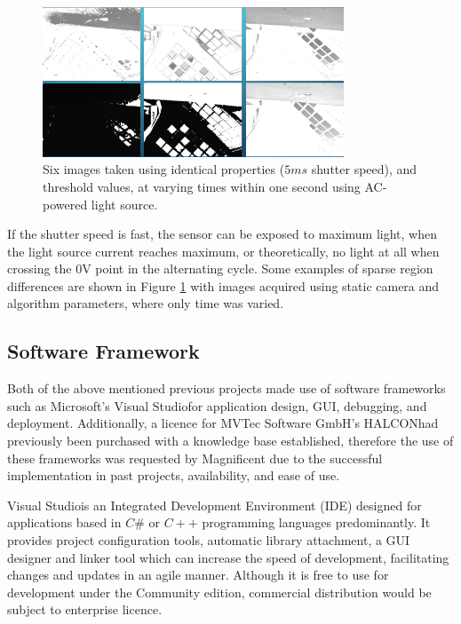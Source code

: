 \documentclass[fleqn,twoside,12pt]{report}
\begin{document}
\begin{figure}[h]
	\centering
	\includegraphics[width=0.8\textwidth]{flicker.png}
	\caption{Six images taken using identical properties ($5ms$ shutter speed), and threshold values, at varying times within one second using AC-powered light source.}
	\label{fig:flicker}
\end{figure}





If the shutter speed is fast, the sensor can be exposed to maximum light, when the light source current reaches maximum, or theoretically, no light at all when crossing the 0V point in the alternating cycle. Some examples of sparse region differences are shown in Figure \ref{fig:flicker} with images acquired using static camera and algorithm parameters, where only time was varied.


\subsection{Software Framework}

Both of the above mentioned previous projects made use of software frameworks such as Microsoft's Visual Studio\textregistered for application design, GUI, debugging, and deployment. Additionally, a licence for MVTec Software GmbH's HALCON\texttrademark had previously been purchased with a knowledge base established, therefore the use of these frameworks was requested by Magnificent due to the successful implementation in past projects, availability, and ease of use.

Visual Studio\textregistered is an Integrated Development Environment (IDE) designed for applications based in $C\#$ or $C++$ programming languages predominantly. It provides project configuration tools, automatic library attachment, a GUI designer and linker tool which can increase the speed of development, facilitating changes and updates in an agile manner. Although it is free to use for development under the Community edition, commercial distribution would be subject to enterprise licence. 
\end{document}
